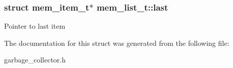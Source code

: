 \subsubsection[{\texorpdfstring{last}{last}}]{\setlength{\rightskip}{0pt plus 5cm}struct {\bf mem\+\_\+item\+\_\+t}$\ast$ mem\+\_\+list\+\_\+t\+::last}\hypertarget{structmem__list__t_ad0d6a4567a65701564f45cb8161f675a}{}\label{structmem__list__t_ad0d6a4567a65701564f45cb8161f675a}
Pointer to last item 

The documentation for this struct was generated from the following file\+:\begin{DoxyCompactItemize}
\item 
garbage\+\_\+collector.\+h\end{DoxyCompactItemize}
